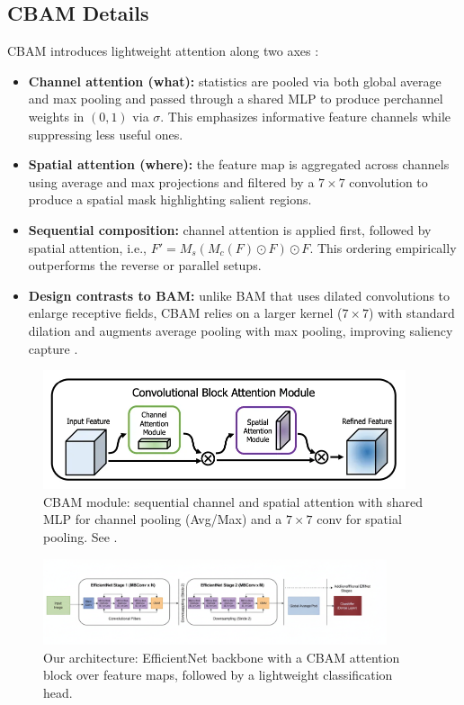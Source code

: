 \subsection{CBAM Details}
CBAM introduces lightweight attention along two axes \cite{woo2018cbam,cbamMedium,cbamDO}:
\begin{itemize}
  \item \textbf{Channel attention (what):} statistics are pooled via both global average and max pooling and passed through a shared MLP to produce per\textendash channel weights in $(0,1)$ via $\sigma$. This emphasizes informative feature channels while suppressing less useful ones.
  \item \textbf{Spatial attention (where):} the feature map is aggregated across channels using average and max projections and filtered by a $7\times7$ convolution to produce a spatial mask highlighting salient regions.
  \item \textbf{Sequential composition:} channel attention is applied first, followed by spatial attention, i.e., $F' = M_s(M_c(F)\odot F)\odot F$. This ordering empirically outperforms the reverse or parallel setups.
  \item \textbf{Design contrasts to BAM:} unlike BAM that uses dilated convolutions to enlarge receptive fields, CBAM relies on a larger kernel ($7\times7$) with standard dilation and augments average pooling with max pooling, improving saliency capture \cite{cbamMedium}.
\end{itemize}

\begin{figure}[t]
  \centering
  \includegraphics[width=0.95\textwidth]{../new_work/figures/about-cbam/cbam-architecture.png}
  \caption{CBAM module: sequential channel and spatial attention with shared MLP for channel pooling (Avg/Max) and a $7\times7$ conv for spatial pooling. See \cite{woo2018cbam,cbamMedium,cbamDO}.}
  \label{fig:cbam_module}
\end{figure}

\begin{figure}[t]
  \centering
  \includegraphics[width=0.9\textwidth]{../new_work/figures/about-cbam/EfficientNet-placement-with-CBAM-architecture.png}
  \caption{Our architecture: EfficientNet backbone with a CBAM attention block over feature maps, followed by a lightweight classification head.}
  \label{fig:cbam_arch}
\end{figure}

